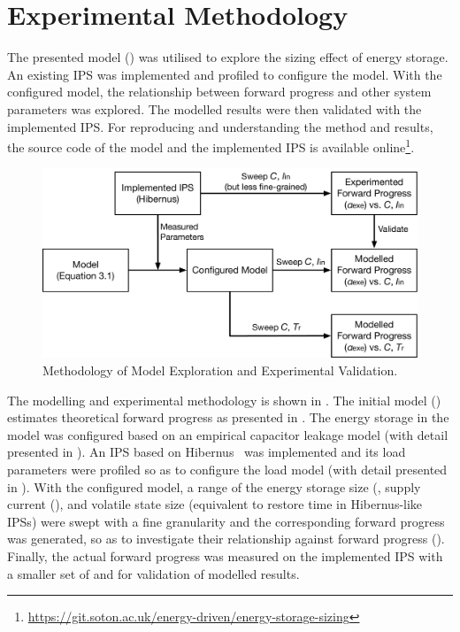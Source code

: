 \section{Experimental Methodology} \label{sec:c3_method}



The presented model () was utilised to explore the sizing effect of energy storage. 
An existing IPS was implemented and profiled to configure the model. 
With the configured model, the relationship between forward progress and other system parameters was explored. 
The modelled results were then validated with the implemented IPS.
For reproducing and understanding the method and results, the source code of the model and the implemented IPS is available online\footnote{\url{https://git.soton.ac.uk/energy-driven/energy-storage-sizing}}.

\begin{figure}
    \centering
    \includegraphics[width=\columnwidth]{ch3_sizingeffect/figures/procedure}
    \caption{Methodology of Model Exploration and Experimental Validation. }
    \label{fig:procedure} 
\end{figure}

The modelling and experimental methodology is shown in .
The initial model () estimates theoretical forward progress as presented in . 
The energy storage in the model was configured based on an empirical capacitor leakage model (with detail presented in ).
An IPS based on Hibernus~\cite{balsamo2015hibernus} was implemented and its load parameters were profiled so as to configure the load model (with detail presented in ).
With the configured model, a range of the energy storage size (, supply current (), and volatile state size (equivalent to restore time  in Hibernus-like IPSs) were swept with a fine granularity and the corresponding forward progress was generated, so as to investigate their relationship against forward progress ().
Finally, the actual forward progress was measured on the implemented IPS with a smaller set of  and  for validation of modelled results. 

